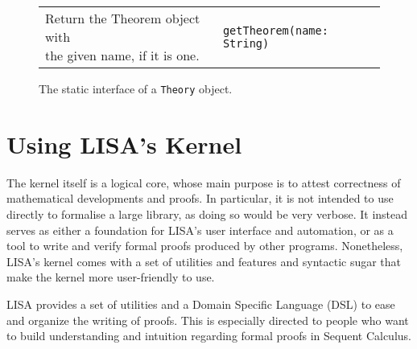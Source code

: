 {\begin{figure}[hp]
\begin{center}
\begin{tabular}{l|l}
          \makecell[l]{Return the Theorem object with   \\the given name, if it is one.} &
          \begin{lstlisting}
getTheorem(name: String)
\end{lstlisting}
          \\ %
        \end{tabular}
        \caption{The static interface of a \lstinline{Theory}{} object.}
        \label{fig:theorygetters}
      \end{center}
    \end{figure}

\fi
  }

\section{Using LISA's Kernel}
\label{sect:kernelsuppl}
The kernel itself is a logical core, whose main purpose is to attest correctness of mathematical developments and proofs. In particular, it is not intended to use directly to formalise a large library, as doing so would be very verbose. It instead serves as either a foundation for LISA's user interface and automation, or as a tool to write and verify formal proofs produced by other programs.
Nonetheless, LISA's kernel comes with a set of utilities and features and syntactic sugar that make the kernel more user-friendly to use.

LISA provides a set of utilities and a Domain Specific Language (DSL) to ease and organize the writing of proofs. This is especially directed to people who want to build understanding and intuition regarding formal proofs in Sequent Calculus.

